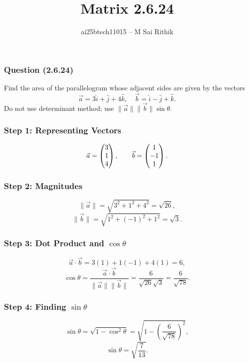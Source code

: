 \documentclass{beamer}
\title{Matrix 2.6.24}
\author{ai25btech11015 -- M Sai Rithik}
\date{}
\begin{document}
\frame{\titlepage}

\begin{frame}
\frametitle{Question (2.6.24)}
Find the area of the parallelogram whose adjacent sides are given by the vectors
\[
\Vec{a} = 3\hat{i} + \hat{j} + 4\hat{k}, \quad 
\Vec{b} = \hat{i} - \hat{j} + \hat{k}.
\]
Do not use determinant method; use $\|\Vec{a}\|\|\Vec{b}\|\sin\theta$.
\end{frame}

\begin{frame}
\frametitle{Step 1: Representing Vectors}
\begin{equation}
\Vec{a} = \begin{pmatrix}3 \\ 1 \\ 4\end{pmatrix}, \qquad
\Vec{b} = \begin{pmatrix}1 \\ -1 \\ 1\end{pmatrix}.
\end{equation}
\end{frame}

\begin{frame}
\frametitle{Step 2: Magnitudes}
\begin{equation}
\|\Vec{a}\| = \sqrt{3^2 + 1^2 + 4^2} = \sqrt{26},
\end{equation}
\begin{equation}
\|\Vec{b}\| = \sqrt{1^2 + (-1)^2 + 1^2} = \sqrt{3}.
\end{equation}
\end{frame}

\begin{frame}
\frametitle{Step 3: Dot Product and $\cos\theta$}
\begin{equation}
\Vec{a}\cdot\Vec{b} = 3(1) + 1(-1) + 4(1) = 6,
\end{equation}
\begin{equation}
\cos\theta = \frac{\Vec{a}\cdot\Vec{b}}{\|\Vec{a}\|\|\Vec{b}\|}
= \frac{6}{\sqrt{26}\sqrt{3}} = \frac{6}{\sqrt{78}}.
\end{equation}
\end{frame}

\begin{frame}
\frametitle{Step 4: Finding $\sin\theta$}
\begin{equation}
\sin\theta = \sqrt{1 - \cos^2\theta}
= \sqrt{1 - \left(\frac{6}{\sqrt{78}}\right)^2},
\end{equation}
\begin{equation}
\sin\theta = \sqrt{\frac{7}{13}}.
\end{equation}
\end{frame}
\end{document}

